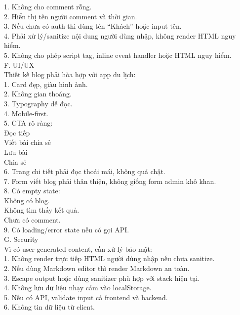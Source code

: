 \begin{enumerate}
1. Không cho comment rỗng. \\
2. Hiển thị tên người comment và thời gian. \\
3. Nếu chưa có auth thì dùng tên “Khách” hoặc input tên. \\
4. Phải xử lý/sanitize nội dung người dùng nhập, không render HTML nguy hiểm. \\
5. Không cho phép script tag, inline event handler hoặc HTML nguy hiểm. \\

F. UI/UX \\
Thiết kế blog phải hòa hợp với app du lịch: \\

1. Card đẹp, giàu hình ảnh. \\
2. Không gian thoáng. \\
3. Typography dễ đọc. \\
4. Mobile-first. \\
5. CTA rõ ràng: \\
\* Đọc tiếp \\
\* Viết bài chia sẻ \\
\* Lưu bài \\
\* Chia sẻ \\

6. Trang chi tiết phải đọc thoải mái, không quá chật. \\
7. Form viết blog phải thân thiện, không giống form admin khô khan. \\
8. Có empty state: \\
\* Không có blog. \\
\* Không tìm thấy kết quả. \\
\* Chưa có comment. \\

9. Có loading/error state nếu có gọi API. \\

G. Security \\
Vì có user-generated content, cần xử lý bảo mật: \\

1. Không render trực tiếp HTML người dùng nhập nếu chưa sanitize. \\
2. Nếu dùng Markdown editor thì render Markdown an toàn. \\
3. Escape output hoặc dùng sanitizer phù hợp với stack hiện tại. \\
4. Không lưu dữ liệu nhạy cảm vào localStorage. \\
5. Nếu có API, validate input cả frontend và backend. \\
6. Không tin dữ liệu từ client. \\


\end{enumerate}
